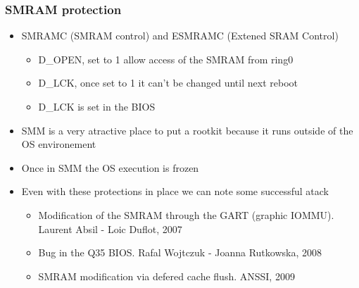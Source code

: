         \begin{frame}
                \frametitle{SMRAM protection}
                \begin{itemize}
                        \item SMRAMC (SMRAM control) and ESMRAMC (Extened SRAM
                        Control)
                        \begin{itemize}
                                \item D\_OPEN, set to 1 allow access of
                                the SMRAM from ring0
                                \item D\_LCK, once set to 1 it can't
                                be changed until next reboot
                                \item D\_LCK is set in the BIOS
                        \end{itemize}
                        \item SMM is a very atractive place to put a
                        rootkit because it runs outside of the OS
                        environement
                        \item Once in SMM the OS execution is frozen
                        \item Even with these protections in place we
                        can note some successful atack
                        \begin{itemize}
                                \item Modification of the SMRAM through
                                the GART (graphic IOMMU). Laurent Absil
                                - Loic Duflot, 2007
                                \item Bug in the Q35 BIOS. Rafal
                                Wojtczuk - Joanna Rutkowska, 2008
                                \item SMRAM modification via defered %
                                cache flush. ANSSI, 2009
                        \end{itemize}
                \end{itemize}
        \end{frame}

